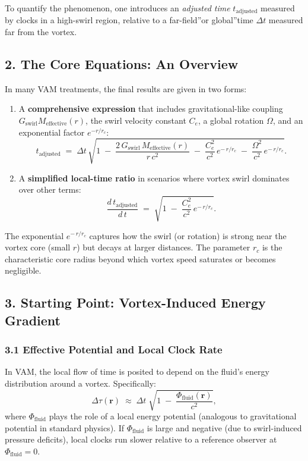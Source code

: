 \documentclass[a4paper,12pt]{article}
\begin{document}
To quantify the phenomenon, one introduces an \textit{adjusted time} \(t_\text{adjusted}\) measured by clocks in a high-swirl region, relative to a \grqq far-field\textquotedblright or \grqq global\textquotedblright time \(\Delta t\) measured far from the vortex.

\subsection*{2. The Core Equations: An Overview}

In many VAM treatments, the final results are given in two forms:

\begin{enumerate}
    \item A \textbf{comprehensive expression} that includes gravitational-like coupling \(G_\text{swirl} M_\text{effective}(r)\), the swirl velocity constant \(C_e\), a global rotation \(\Omega\), and an exponential factor \(e^{-r/r_c}\):
    \[
        t_\text{adjusted}
        \;=\;
        \Delta t \,\sqrt{
            1
            \;-\;
            \frac{2\,G_\text{swirl}\,M_\text{effective}(r)}{r\,c^2}
            \;-\;
            \frac{C_e^2}{c^2}\, e^{-\,r/r_c}
            \;-\;
            \frac{\Omega^2}{c^2}\, e^{-\,r/r_c}
        }.
    \]
    \item A \textbf{simplified local-time ratio} in scenarios where vortex swirl dominates over other terms:
    \[
        \frac{d\,t_\text{adjusted}}{d\,t}
        \;=\;
        \sqrt{
            1
            \;-\;
            \frac{C_e^2}{c^2}\, e^{-\,r/r_c}
        }.
    \]
\end{enumerate}

The exponential \(e^{-\,r/r_c}\) captures how the swirl (or rotation) is strong near the vortex core (small \(r\)) but decays at larger distances. The parameter \(r_c\) is the characteristic core radius beyond which vortex speed saturates or becomes negligible.

\subsection*{3. Starting Point: Vortex-Induced Energy Gradient}

\subsubsection*{3.1 Effective Potential and Local Clock Rate}

In VAM, the local flow of time is posited to depend on the fluid's energy distribution around a vortex. Specifically:
\[
    \Delta \tau(\mathbf{r})
    \;\approx\;
    \Delta t
    \;\sqrt{
        1
        \;-\;
        \frac{\Phi_{\mathrm{fluid}}(\mathbf{r})}{c^2}
    },
\]
where \(\Phi_{\mathrm{fluid}}\) plays the role of a local energy potential (analogous to gravitational potential in standard physics). If \(\Phi_{\mathrm{fluid}}\) is large and negative (due to swirl-induced pressure deficits), local clocks run slower relative to a reference observer at \(\Phi_{\mathrm{fluid}}=0\).
\end{document}
